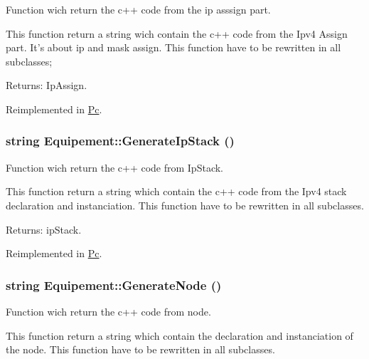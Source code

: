 Function wich return the c++ code from the ip asssign part. 

This function return a string wich contain the c++ code from the Ipv4 Assign part. It's about ip and mask assign. This function have to be rewritten in all subclasses;

\begin{Desc}
\item[Returns:]IpAssign. \end{Desc}


Reimplemented in \hyperlink{class_pc_b743fd5f5d74f1d5db9549aa43fab9c5}{Pc}.\hypertarget{class_equipement_37fe31be30e3ea66fe6bdaab9d66bc15}{
\subsubsection[{GenerateIpStack}]{\setlength{\rightskip}{0pt plus 5cm}string Equipement::GenerateIpStack ()}}
\label{class_equipement_37fe31be30e3ea66fe6bdaab9d66bc15}


Function wich return the c++ code from IpStack. 

This function return a string which contain the c++ code from the Ipv4 stack declaration and instanciation. This function have to be rewritten in all subclasses.

\begin{Desc}
\item[Returns:]ipStack. \end{Desc}


Reimplemented in \hyperlink{class_pc_205240ed7c68ad780ff4a669376c04eb}{Pc}.\hypertarget{class_equipement_e51f720e7db340b33d7392eb78c9cea2}{
\subsubsection[{GenerateNode}]{\setlength{\rightskip}{0pt plus 5cm}string Equipement::GenerateNode ()}}
\label{class_equipement_e51f720e7db340b33d7392eb78c9cea2}


Function wich return the c++ code from node. 

This function return a string which contain the declaration and instanciation of the node. This function have to be rewritten in all subclasses.

